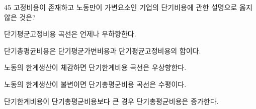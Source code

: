 \begin{question}{45}
고정비용이 존재하고 노동만이 가변요소인 기업의 단기비용에 관한 설명으로 옳지 않은 것은?
\begin{choices}
  \item 단기평균고정비용 곡선은 언제나 우하향한다.
  \item 단기총평균비용은 단기평균가변비용과 단기평균고정비용의 합이다.
  \item 노동의 한계생산이 체감하면 단기한계비용 곡선은 우상향한다.
  \item 노동의 한계생산이 불변이면 단기총평균비용 곡선은 수평이다.
  \item 단기한계비용이 단기총평균비용보다 큰 경우 단기총평균비용은 증가한다.
\end{choices}
\end{question}
